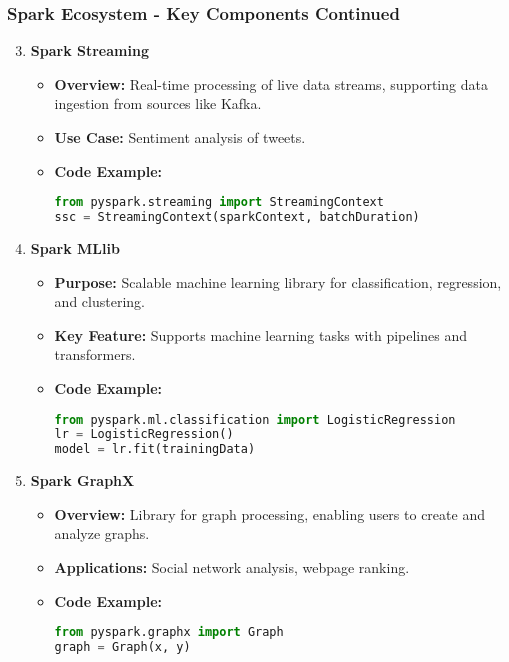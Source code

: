 \documentclass[aspectratio=169]{beamer}
\begin{document}
\begin{frame}[fragile]
    \frametitle{Spark Ecosystem - Key Components Continued}
    \begin{enumerate}
        \setcounter{enumi}{2} %
        \item \textbf{Spark Streaming}
            \begin{itemize}
                \item \textbf{Overview:} Real-time processing of live data streams, supporting data ingestion from sources like Kafka.
                \item \textbf{Use Case:} Sentiment analysis of tweets.
                \item \textbf{Code Example:}
                \begin{lstlisting}[language=Python]
from pyspark.streaming import StreamingContext
ssc = StreamingContext(sparkContext, batchDuration)
                \end{lstlisting}
            \end{itemize}

        \item \textbf{Spark MLlib}
            \begin{itemize}
                \item \textbf{Purpose:} Scalable machine learning library for classification, regression, and clustering.
                \item \textbf{Key Feature:} Supports machine learning tasks with pipelines and transformers.
                \item \textbf{Code Example:}
                \begin{lstlisting}[language=Python]
from pyspark.ml.classification import LogisticRegression
lr = LogisticRegression()
model = lr.fit(trainingData)
                \end{lstlisting}
            \end{itemize}

        \item \textbf{Spark GraphX}
            \begin{itemize}
                \item \textbf{Overview:} Library for graph processing, enabling users to create and analyze graphs.
                \item \textbf{Applications:} Social network analysis, webpage ranking.
                \item \textbf{Code Example:}
                \begin{lstlisting}[language=Python]
from pyspark.graphx import Graph
graph = Graph(x, y)
                \end{lstlisting}
            \end{itemize}
    \end{enumerate}
\end{frame}
\end{document}
